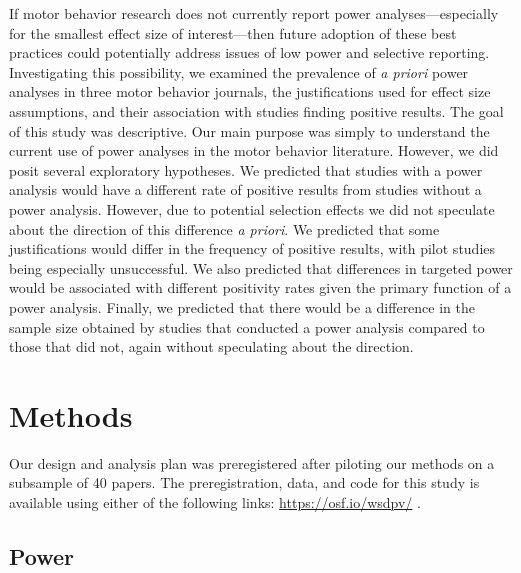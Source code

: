 \documentclass[
  man, donotrepeattitle,mask,floatsintext]{apa7}
\begin{document}
If motor behavior research does not currently report power analyses---especially for the smallest effect size of interest---then future adoption of these best practices could potentially address issues of low power and selective reporting. Investigating this possibility, we examined the prevalence of \emph{a priori} power analyses in three motor behavior journals, the justifications used for effect size assumptions, and their association with studies finding positive results. The goal of this study was descriptive. Our main purpose was simply to understand the current use of power analyses in the motor behavior literature. However, we did posit several exploratory hypotheses. We predicted that studies with a power analysis would have a different rate of positive results from studies without a power analysis. However, due to potential selection effects we did not speculate about the direction of this difference \emph{a priori}. We predicted that some justifications would differ in the frequency of positive results, with pilot studies being especially unsuccessful. We also predicted that differences in targeted power would be associated with different positivity rates given the primary function of a power analysis. Finally, we predicted that there would be a difference in the sample size obtained by studies that conducted a power analysis compared to those that did not, again without speculating about the direction.

\hypertarget{methods}{%
\section{Methods}\label{methods}}

Our design and analysis plan was preregistered after piloting our methods on a subsample of 40 papers. The preregistration, data, and code for this study is available using either of the following links: \url{https://osf.io/wsdpv/}  .

\hypertarget{power}{%
\subsection{Power}\label{power}}
\end{document}
